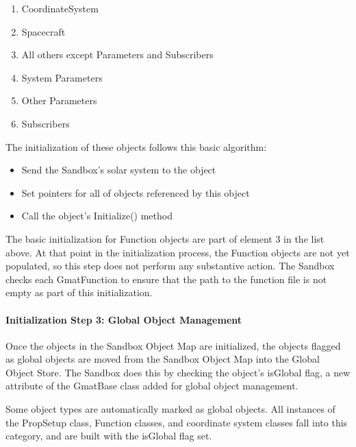 \begin{enumerate}
\item CoordinateSystem
\item Spacecraft
\item All others except Parameters and Subscribers
\item System Parameters
\item Other Parameters
\item Subscribers
\end{enumerate}

\noindent The initialization of these objects follows this basic algorithm:

\begin{itemize}
\item Send the Sandbox's solar system to the object
\item Set pointers for all of objects referenced by this object
\item Call the object's Initialize() method
\end{itemize}

\noindent The basic initialization for Function objects are part of element 3 in the list above.  At
that point in the initialization process, the Function objects are not yet populated, so this step
does not perform any substantive action.  The Sandbox checks each GmatFunction to ensure that the
path to the function file is not empty as part of this initialization.

\paragraph{\label{section:GlobalObjectManagement}Initialization Step 3: Global Object Management}
Once the objects in the Sandbox Object Map are initialized, the objects flagged as global objects
are moved from the Sandbox Object Map into the Global Object Store.  The Sandbox does this by
checking the object's isGlobal flag, a new attribute of the GmatBase class added for global object
management.

Some object types are automatically marked as global objects.  All instances of the PropSetup class,
Function classes, and coordinate system classes fall into this category, and are built with the
isGlobal flag set.

